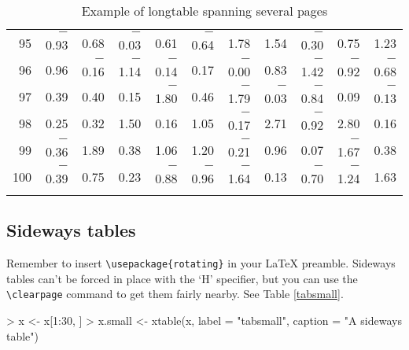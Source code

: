 \documentclass[letterpaper]{article}
\begin{document}
\begin{Schunk}
\begin{longtable}{rrrrrrrrrrr}
  95 & $-$0.93 & 0.68 & $-$0.03 & 0.61 & $-$0.64 & 1.78 & 1.54 & $-$0.30 & 0.75 & 1.23 \\
  96 & 0.96 & $-$0.16 & $-$1.14 & $-$0.14 & 0.17 & $-$0.00 & 0.83 & $-$1.42 & $-$0.92 & $-$0.68 \\
  97 & 0.39 & 0.40 & 0.15 & $-$1.80 & 0.46 & $-$1.79 & $-$0.03 & $-$0.84 & 0.09 & $-$0.13 \\
  98 & 0.25 & 0.32 & 1.50 & 0.16 & 1.05 & $-$0.17 & 2.71 & $-$0.92 & 2.80 & 0.16 \\
  99 & $-$0.36 & 1.89 & 0.38 & 1.06 & 1.20 & $-$0.21 & 0.96 & 0.07 & $-$1.67 & 0.38 \\
  100 & $-$0.39 & 0.75 & 0.23 & $-$0.88 & $-$0.96 & $-$1.64 & 0.13 & $-$0.70 & $-$1.24 & 1.63 \\
   \hline
\hline
\caption{Example of longtable spanning several pages}
\label{tabbig}
\end{longtable}\end{Schunk}


\subsection{Sideways tables} 
Remember to insert \verb|\usepackage{rotating}| in your LaTeX preamble.
Sideways tables can't be forced in place with the `H' specifier, but you can 
use the \verb|\clearpage| command to get them fairly nearby.
See Table \ref{tabsmall}.

\begin{Schunk}
\begin{Sinput}
> x <- x[1:30, ]
> x.small <- xtable(x, label = "tabsmall", caption = "A sideways table")
\end{Sinput}
\end{Schunk}
\end{document}
